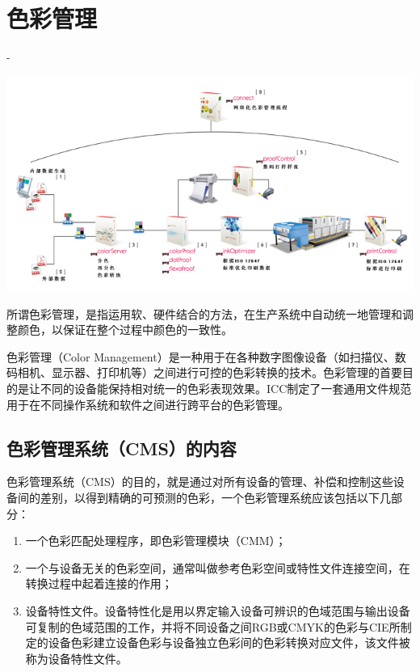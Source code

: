 \section {色彩管理}

-
    \begin{center}
        \includegraphics[scale=0.7] {colormanage.jpg}
    \end{center}

    所谓色彩管理，是指运用软、硬件结合的方法，在生产系统中自动统一地管理和调整颜色，以保证在整个过程中颜色的一致性。

    色彩管理（Color Management）是一种用于在各种数字图像设备（如扫描仪、数码相机、显示器、打印机等）之间进行可控的色彩转换的技术。色彩管理的首要目的是让不同的设备能保持相对统一的色彩表现效果。ICC制定了一套通用文件规范用于在不同操作系统和软件之间进行跨平台的色彩管理。

\subsection {色彩管理系统（CMS）的内容}

    色彩管理系统（CMS）的目的，就是通过对所有设备的管理、补偿和控制这些设备间的差别，以得到精确的可预测的色彩，一个色彩管理系统应该包括以下几部分：

    \begin{enumerate}
        \item  一个色彩匹配处理程序，即色彩管理模块（CMM）；
        \item  一个与设备无关的色彩空间，通常叫做参考色彩空间或特性文件连接空间，在转换过程中起着连接的作用；
        \item  设备特性文件。设备特性化是用以界定输入设备可辨识的色域范围与输出设备可复制的色域范围的工作，并将不同设备之间RGB或CMYK的色彩与CIE所制定的设备色彩建立设备色彩与设备独立色彩间的色彩转换对应文件，该文件被称为设备特性文件。
    \end{enumerate}

